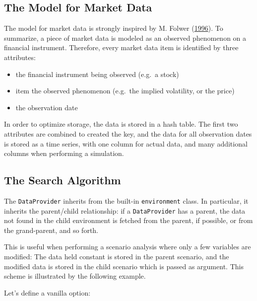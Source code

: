 \documentclass[justified]{tufte-book}
\providecommand{\tightlist}{%
  \setlength{\itemsep}{0pt}\setlength{\parskip}{0pt}}
\newcommand{\class}[1]{\texttt{#1}}
\newcommand{\code}[1]{\texttt{#1}\index{#1}}
\begin{document}
\hypertarget{the-model-for-market-data}{%
\subsection{The Model for Market Data}\label{the-model-for-market-data}}

The model for market data is strongly inspired by M. Folwer (\protect\hyperlink{ref-Fowler1996}{1996}). To summarize, a piece of market data is modeled as an observed phenomenon on a financial instrument. Therefore, every market data item is identified by three attributes:

\begin{itemize}
\tightlist
\item
  the financial instrument being observed (e.g.~a stock)
\item
  item the observed phenomenon (e.g.~the implied volatility, or the price)
\item
  the observation date
\end{itemize}

In order to optimize storage, the data is stored in a hash table. The first two attributes are combined to created the key, and the data for all observation dates is stored as a time series, with one column for actual data, and many additional columns when performing a simulation.

\hypertarget{the-search-algorithm}{%
\subsection{The Search Algorithm}\label{the-search-algorithm}}

The \class{DataProvider} inherits from the built-in \code{environment} class. In particular, it inherits the parent/child relationship: if a \class{DataProvider} has a parent, the data not found in the child environment is fetched from the parent, if possible, or from the grand-parent, and so forth.

This is useful when performing a scenario analysis where only a few variables are modified: The data held constant is stored in the parent scenario, and the modified data is stored in the child scenario which is passed as argument. This scheme is illustrated by the following example.

Let's define a vanilla option:
\end{document}
